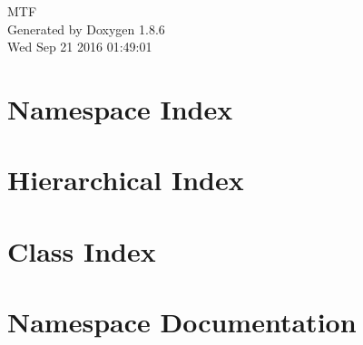 \documentclass[twoside]{book}
\newcommand{\clearemptydoublepage}{%
  \newpage{\pagestyle{empty}\cleardoublepage}%
}
\begin{document}
\hypersetup{pageanchor=false}
\begin{titlepage}
\vspace*{7cm}
\begin{center}%
{\Large M\-T\-F }\\
\vspace*{1cm}
{\large Generated by Doxygen 1.8.6}\\
\vspace*{0.5cm}
{\small Wed Sep 21 2016 01:49:01}\\
\end{center}
\end{titlepage}
\clearemptydoublepage
\tableofcontents
\clearemptydoublepage
{}
\hypersetup{pageanchor=true}

\chapter{Namespace Index}

\chapter{Hierarchical Index}

\chapter{Class Index}

\chapter{Namespace Documentation}

\end{document}

